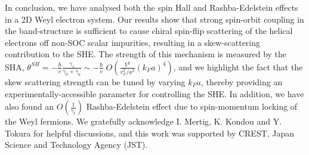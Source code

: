 \documentclass[twocolumn,epsfig,a4paper,amsmath,amssymb,showpacs,prl,superscriptaddress]{revtex4-1}
\begin{document}
In conclusion, we have analysed both the spin Hall and Rashba-Edelstein effects in a 2D Weyl electron system. Our results show that strong spin-orbit coupling in the band-structure is sufficient to cause chiral spin-flip scattering of the helical electrons off non-SOC scalar impurities, resulting in a skew-scattering contribution to the SHE. The strength of this mechanism is measured by the SHA, $\theta^{SH} = -\tfrac{\hbar}{e} \frac{\gamma_{s}}{\gamma_0 + \gamma_a} \sim -\tfrac{\hbar}{e} \; O\left( \tfrac{V^2}{v_F^2/a^2} (k_F a)^4 \right) $, and we highlight the fact that the skew scattering strength can be tuned by varying $k_F a$, thereby providing an experimentally-accessible parameter for controlling the SHE. In addition, we have also found an $O(\tfrac{1}{\gamma_t})$ Rashba-Edelstein effect due to spin-momentum locking of the Weyl fermions. We gratefully acknowledge I. Mertig, K. Kondou and Y. Tokura for helpful discussions, and this work was supported by CREST, Japan Science and Technology Agency (JST).


\end{document}
